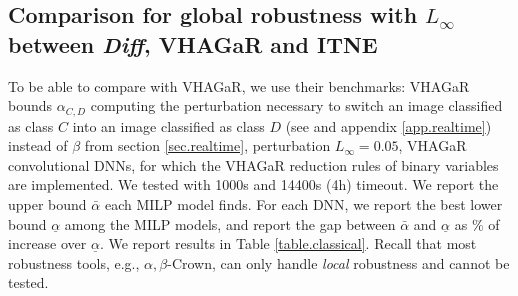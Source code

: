 \subsection{Comparison for global robustness with $L_\infty$ between {\em Diff}, VHAGaR and ITNE}

To be able to compare with VHAGaR, we use their benchmarks: 
VHAGaR bounds $\alpha_{C,D}$ 
computing the perturbation necessary to switch an image classified as class $C$ into an image classified as class $D$ (see \cite{vhagar} and appendix \ref{app.realtime}) instead of $\beta$ from section \ref{sec.realtime}, perturbation 
$L_\infty=0.05$, VHAGaR convolutional DNNs, for which the VHAGaR reduction rules of binary variables are implemented. 
We tested with 1000s and 14400s (4h) timeout. We report the upper bound $\bar{\alpha}$ each MILP model finds. For each DNN, we report the best lower bound $\underline{\alpha}$ among the MILP models, and report the gap between $\bar{\alpha}$ and  $\underline{\alpha}$ as $\%$ of increase over $\underline{\alpha}$. We report results in Table \ref{table.classical}. Recall that most robustness tools, e.g., $\alpha,\beta$-Crown, can only handle {\em local} robustness and cannot be tested.

\iffalse

